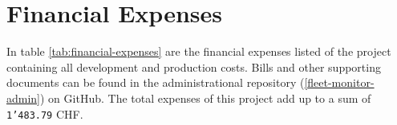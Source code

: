 \begin{adjustwidth}{0.23cm}{0cm} \hfuzz=7.0pt \vfuzz=19.0pt
\end{adjustwidth}
\newpage

\section{Financial Expenses} \label{Financial Expenses}
In table \ref{tab:financial-expenses} are the financial expenses listed of the project containing all development and production costs. Bills and other supporting documents can be found in the administrational repository (\ref{fleet-monitor-admin}) on GitHub. The total expenses of this project add up to a sum of \texttt{1’483.79} CHF.


